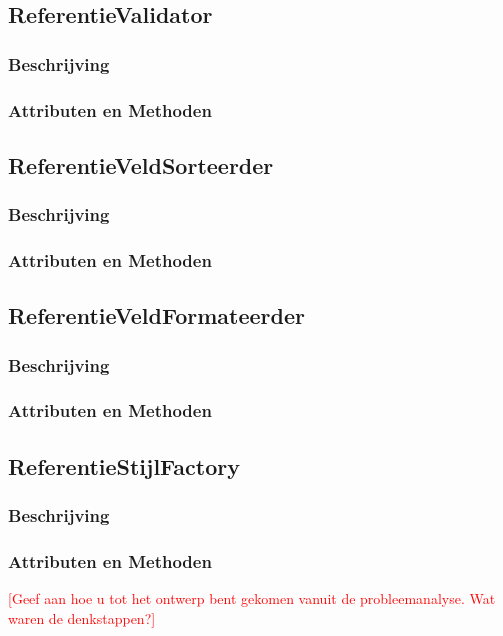 \documentclass[a4paper]{article}
\newcommand{\todo}[1]{\textcolor{red}{[#1]}}
\begin{document}
\subsection{ReferentieValidator}
\subsubsection{Beschrijving}
\subsubsection{Attributen en Methoden}

\subsection{ReferentieVeldSorteerder}
\subsubsection{Beschrijving}
\subsubsection{Attributen en Methoden}

\subsection{ReferentieVeldFormateerder}
\subsubsection{Beschrijving}
\subsubsection{Attributen en Methoden}

\subsection{ReferentieStijlFactory}
\subsubsection{Beschrijving}
\subsubsection{Attributen en Methoden}

\todo{Geef aan hoe u tot het ontwerp bent gekomen vanuit de probleemanalyse. Wat waren de denkstappen?}
\end{document}
